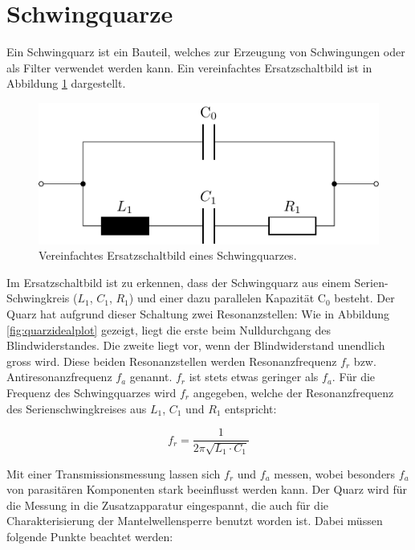 \documentclass[twoside,a4paper,11pt,halfparskip,DIV=11,notitlepage]{scrartcl}
\begin{document}
\newpage %
\section{Schwingquarze}
Ein Schwingquarz ist ein Bauteil, welches zur Erzeugung von Schwingungen oder
als Filter verwendet werden kann. Ein vereinfachtes Ersatzschaltbild ist in
Abbildung \ref{fig:quarzersatz} dargestellt. 

\begin{figure}[H]
    \begin{center}
        \includegraphics{figures/quartz_model/quartz_model.pdf}
    \end{center}
    \caption{Vereinfachtes Ersatzschaltbild eines Schwingquarzes.}
    \label{fig:quarzersatz}
\end{figure}

Im Ersatzschaltbild ist zu erkennen, dass der Schwingquarz aus einem
Serien-Schwingkreis ($L_1$, $C_1$, $R_1$) und einer dazu parallelen Kapazität
C$_0$ besteht. Der Quarz hat aufgrund dieser Schaltung zwei Resonanzstellen:
Wie in Abbildung \ref{fig:quarzidealplot} gezeigt, liegt die erste beim
Nulldurchgang des Blindwiderstandes. Die zweite liegt vor, wenn der Blindwiderstand
unendlich gross wird. Diese beiden Resonanzstellen werden Resonanzfrequenz $f_r$
bzw. Antiresonanzfrequenz $f_a$ genannt. $f_r$ ist stets etwas geringer als
$f_a$. Für die Frequenz des Schwingquarzes wird $f_r$ angegeben, welche der
Resonanzfrequenz des Serienschwingkreises aus $L_1$, $C_1$ und $R_1$
entspricht:

$$
f_r = \frac{1}{2\pi\sqrt{L_1\cdot C_1}}
$$

Mit einer Transmissionsmessung lassen sich $f_r$ und $f_a$ messen, wobei besonders $f_a$ von parasitären Komponenten
stark beeinflusst werden kann. Der Quarz wird für die Messung in die Zusatzapparatur eingespannt, die auch für die
Charakterisierung der Mantelwellensperre benutzt worden ist. Dabei müssen folgende Punkte beachtet werden:
\end{document}
